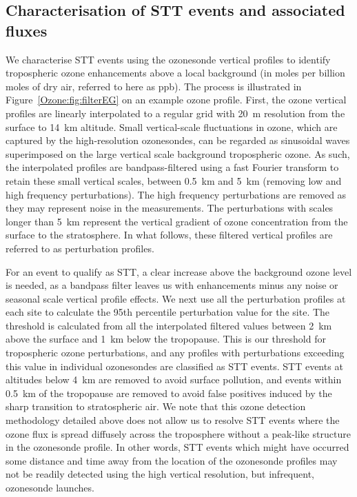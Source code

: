   \subsection{Characterisation of STT events and associated fluxes}
    \label{Ozone:CharacterisationOfSTTs}
    
    We characterise STT events using the ozonesonde vertical profiles to identify tropospheric ozone enhancements above a local background (in moles per billion moles of dry air, referred to here as ppb).
    The process is illustrated in Figure~\ref{Ozone:fig:filterEG} on an example ozone profile.
    First, the ozone vertical profiles are linearly interpolated to a regular grid with 20~m resolution from the surface to 14~km altitude. 
    Small vertical-scale fluctuations in ozone, which are captured by the high-resolution ozonesondes, can be regarded as sinusoidal waves superimposed on the large vertical scale background tropospheric ozone.
    As such, the interpolated profiles are bandpass-filtered using a fast Fourier transform \parencite{Press1992} to retain these small vertical scales, between 0.5~km and 5~km (removing low and high frequency perturbations).
    The high frequency perturbations are removed as they may represent noise in the measurements.
    The perturbations with scales longer than 5~km represent the vertical gradient of ozone concentration from the surface to the stratosphere.
    In what follows, these filtered vertical profiles are referred to as perturbation profiles.
    
    For an event to qualify as STT, a clear increase above the background ozone level is needed, as a bandpass filter leaves us with enhancements minus any noise or seasonal scale vertical profile effects.
    We next use all the perturbation profiles at each site to calculate the 95th percentile perturbation value for the site.
    The threshold is calculated from all the interpolated filtered values between 2~km above the surface and 1~km below the tropopause.
    This is our threshold for tropospheric ozone perturbations, and any profiles with perturbations exceeding this value in individual ozonesondes are classified as STT events.
    STT events at altitudes below 4~km are removed to avoid surface pollution, and events within 0.5~km of the tropopause are removed to avoid false positives induced by the sharp transition to stratospheric air.
    We note that this ozone detection methodology detailed above does not allow us to resolve STT events where the ozone flux is spread diffusely across the troposphere without a peak-like structure in the ozonesonde profile. 
    In other words, STT events which might have occurred some distance and time away from the location of the ozonesonde profiles may not be readily detected using the high vertical resolution, but infrequent, ozonesonde launches.
    
